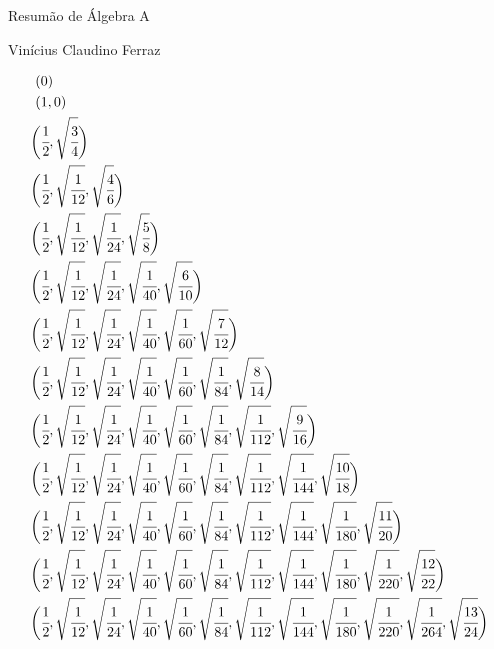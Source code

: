\documentclass[8pt,a4paper]{article}
\date{}
\begin{document}
	\Large

	\begin{center}
		Resum\~ao de \'Algebra A

		Vin\'icius Claudino Ferraz
	\end{center}

	\normalsize

		\begin{align*}
			(&0) \\
			(&1 , 0) \\
			\biggl(&\cfrac{1}{2} , \sqrt{\cfrac{3}{4}}\biggl) \\
			\biggl(&\cfrac{1}{2} , \sqrt{\cfrac{1}{12}} , \sqrt{\cfrac{4}{6}}\biggl) \\
			\biggl(&\cfrac{1}{2} , \sqrt{\cfrac{1}{12}} , \sqrt{\cfrac{1}{24}} , \sqrt{\cfrac{5}{8}}\biggl) \\
			\biggl(&\cfrac{1}{2} , \sqrt{\cfrac{1}{12}} , \sqrt{\cfrac{1}{24}} , \sqrt{\cfrac{1}{40}} , \sqrt{\cfrac{6}{10}}\biggl) \\
			\biggl(&\cfrac{1}{2} , \sqrt{\cfrac{1}{12}} , \sqrt{\cfrac{1}{24}} , \sqrt{\cfrac{1}{40}} , \sqrt{\cfrac{1}{60}} , \sqrt{\cfrac{7}{12}}\biggl) \\
			\biggl(&\cfrac{1}{2} , \sqrt{\cfrac{1}{12}} , \sqrt{\cfrac{1}{24}} , \sqrt{\cfrac{1}{40}} , \sqrt{\cfrac{1}{60}} , \sqrt{\cfrac{1}{84}} , \sqrt{\cfrac{8}{14}}\biggl) \\
			\biggl(&\cfrac{1}{2} , \sqrt{\cfrac{1}{12}} , \sqrt{\cfrac{1}{24}} , \sqrt{\cfrac{1}{40}} , \sqrt{\cfrac{1}{60}} , \sqrt{\cfrac{1}{84}} , \sqrt{\cfrac{1}{112}} , \sqrt{\cfrac{9}{16}}\biggl) \\
			\biggl(&\cfrac{1}{2} , \sqrt{\cfrac{1}{12}} , \sqrt{\cfrac{1}{24}} , \sqrt{\cfrac{1}{40}} , \sqrt{\cfrac{1}{60}} , \sqrt{\cfrac{1}{84}} , \sqrt{\cfrac{1}{112}} , \sqrt{\cfrac{1}{144}} , \sqrt{\cfrac{10}{18}}\biggl) \\
			\biggl(&\cfrac{1}{2} , \sqrt{\cfrac{1}{12}} , \sqrt{\cfrac{1}{24}} , \sqrt{\cfrac{1}{40}} , \sqrt{\cfrac{1}{60}} , \sqrt{\cfrac{1}{84}} , \sqrt{\cfrac{1}{112}} , \sqrt{\cfrac{1}{144}} , \sqrt{\cfrac{1}{180}} , \sqrt{\cfrac{11}{20}}\biggl) \\
			\biggl(&\cfrac{1}{2} , \sqrt{\cfrac{1}{12}} , \sqrt{\cfrac{1}{24}} , \sqrt{\cfrac{1}{40}} , \sqrt{\cfrac{1}{60}} , \sqrt{\cfrac{1}{84}} , \sqrt{\cfrac{1}{112}} , \sqrt{\cfrac{1}{144}} , \sqrt{\cfrac{1}{180}} , \sqrt{\cfrac{1}{220}} , \sqrt{\cfrac{12}{22}}\biggl) \\
			\biggl(&\cfrac{1}{2} , \sqrt{\cfrac{1}{12}} , \sqrt{\cfrac{1}{24}} , \sqrt{\cfrac{1}{40}} , \sqrt{\cfrac{1}{60}} , \sqrt{\cfrac{1}{84}} , \sqrt{\cfrac{1}{112}} , \sqrt{\cfrac{1}{144}} , \sqrt{\cfrac{1}{180}} , \sqrt{\cfrac{1}{220}} , \sqrt{\cfrac{1}{264}} , \sqrt{\cfrac{13}{24}}\biggl) \\

\end{align*}
\end{document}
